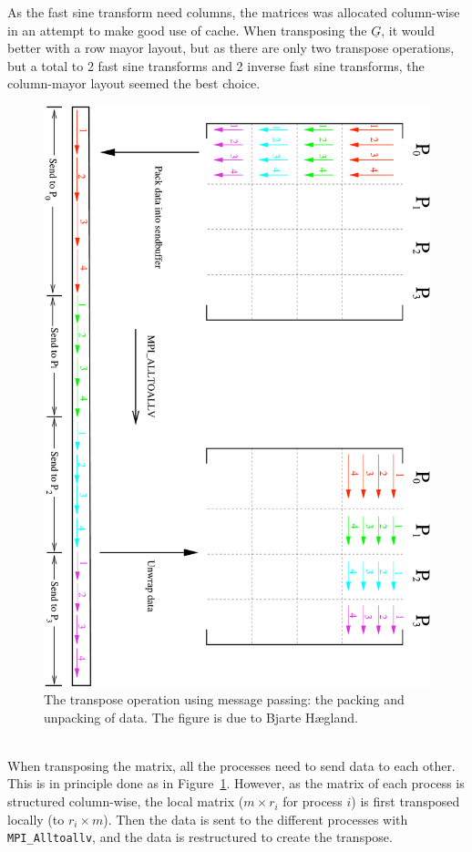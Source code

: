 As the fast sine transform need columns, the matrices was allocated column-wise in an attempt to make good use of cache. When transposing the $\underline{G}$, it would better with a row mayor layout, but as there are only two transpose operations, but a total to 2 fast sine transforms and 2 inverse fast sine transforms, the column-mayor layout seemed the best choice. \\
%
\begin{figure}[h!]
\begin{center}
    \includegraphics[angle=90,scale=0.35]{./Figures/matrix_blocktranspose.pdf}
\end{center}
\caption{The transpose operation using message passing: the packing and unpacking of data. The figure is due to Bjarte Hægland.}
\label{fig:mpisend}
\end{figure}
\\
When transposing the matrix, all the processes need to send data to each other. This is in principle done as in Figure~\ref{fig:mpisend}. However, as the matrix of each process is structured column-wise, the local matrix ($m \times r_i$ for process $i$) is first transposed locally (to $r_i \times m$). Then the data is sent to the different processes with \verb+MPI_Alltoallv+, and the data is restructured to create the transpose. \\
\\
